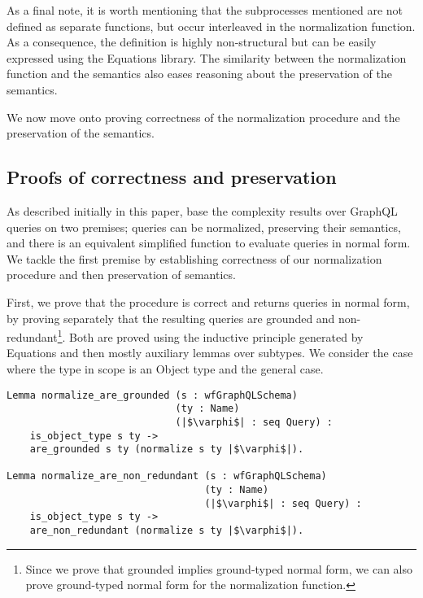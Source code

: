 As a final note, it is worth mentioning that the subprocesses mentioned are not defined as separate functions, but occur interleaved in the normalization function. As a consequence, the definition is highly non-structural but can be easily expressed using the Equations library. The  similarity between the normalization function and the semantics also eases reasoning about the preservation of the semantics. 

We now move onto proving correctness of the normalization procedure and the preservation of the semantics.



\subsection{Proofs of correctness and preservation}

As described initially in this paper, \HP{} base the complexity results over GraphQL queries on two premises; queries can be normalized, preserving their semantics, and there is an equivalent simplified function to evaluate queries in normal form. We tackle the first premise by establishing correctness of our normalization procedure and then preservation of semantics.

First, we prove that the procedure is correct and returns queries in normal form, by proving separately that the resulting queries are grounded and non-redundant\footnote{Since we prove that grounded implies ground-typed normal form, we can also prove ground-typed normal form for the normalization function.}. Both are proved using the inductive principle generated by Equations and then mostly auxiliary lemmas over subtypes.  We consider the case where the type in scope is an Object type and the general case. 

\begin{verbatim}
Lemma normalize_are_grounded (s : wfGraphQLSchema)
                             (ty : Name)
                             (|$\varphi$| : seq Query) :
    is_object_type s ty ->
    are_grounded s ty (normalize s ty |$\varphi$|).

Lemma normalize_are_non_redundant (s : wfGraphQLSchema)
                                  (ty : Name)
                                  (|$\varphi$| : seq Query) :
    is_object_type s ty ->
    are_non_redundant (normalize s ty |$\varphi$|).

\end{verbatim}


